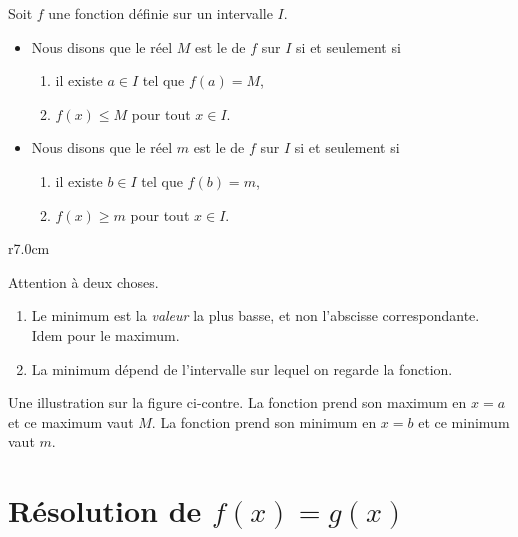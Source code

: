 \begin{definition}
      Soit $f$ une fonction définie sur un intervalle \( I\).
      \begin{itemize}
            \item 
                Nous disons que le réel \( M\) est le  de \( f\) sur $I$ si et seulement si 
                \begin{enumerate}
                    \item
                        il existe $ a\in I$ tel que $f(a)=M$,
                    \item
                        \( f(x)\leq M\) pour tout $x\in I$.
                \end{enumerate}
                
          \item 
                Nous disons que le réel \( m\) est le  de \( f\) sur $I$ si et seulement si
                \begin{enumerate}
                    \item
                        il existe $ b\in I$ tel que $f(b)=m$,
                    \item
                        $f(x)\geq m$ pour tout \( x\in I\).
                \end{enumerate}
      \end{itemize}
\end{definition}

\begin{wrapfigure}[9]{r}{7.0cm}
   \vspace{-0.5cm}        %
   \centering
   
\end{wrapfigure}

\begin{remark}
    Attention à deux choses.
    \begin{enumerate}
        \item
            Le minimum est la \emph{valeur} la plus basse, et non l'abscisse correspondante. Idem pour le maximum. 
        \item
            La minimum dépend de l'intervalle sur lequel on regarde la fonction.
    \end{enumerate}
\end{remark}

Une illustration sur la figure ci-contre. La fonction prend son maximum en \( x=a\) et ce maximum vaut \( M\). La fonction prend son minimum en \( x=b\) et ce minimum vaut \( m\).

\section{Résolution de \texorpdfstring{$ f(x)=g(x)$}{f(x)=g(x)}}

